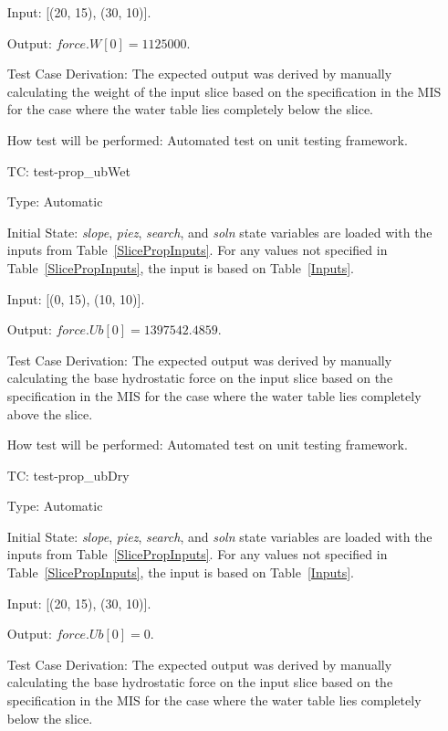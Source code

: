 \documentclass[12pt, titlepage]{article}
\newcounter{utestnum} %
\begin{document}
\begin{enumerate}[label=TC\arabic*:,ref={\arabic*}]
	Input: [(20, 15), (30, 10)].
	
	Output: $\textit{force.W}[0] = 1125000$.
	
	Test Case Derivation: The expected output was derived by manually 
	calculating the weight of the input slice based on the specification in the 
	MIS for the case where the water table lies completely below the slice.
	
	How test will be performed: Automated test on unit testing framework.
	
	\item [TC\refstepcounter{utestnum}\theutestnum: 
	\label{TC_PropertyUbWet}] 
	test-prop\_ubWet
	
	Type: Automatic
	
	Initial State: \textit{slope}, \textit{piez}, \textit{search}, and 
	\textit{soln} state variables are loaded with the inputs from 
	Table~\ref{SlicePropInputs}. For any values not specified in 
	Table~\ref{SlicePropInputs}, the input is based on Table~\ref{Inputs}.
	
	Input: [(0, 15), (10, 10)].
	
	Output: $\textit{force.Ub}[0] = 1397542.4859$.
	
	Test Case Derivation: The expected output was derived by manually 
	calculating the base hydrostatic force on the input slice based on the 
	specification in the MIS for the case where the water table lies completely 
	above the slice.
	
	How test will be performed: Automated test on unit testing framework.
	
	\item [TC\refstepcounter{utestnum}\theutestnum: 
	\label{TC_PropertyUbDry}] 
	test-prop\_ubDry
	
	Type: Automatic
	
	Initial State: \textit{slope}, \textit{piez}, \textit{search}, and 
	\textit{soln} state variables are loaded with the inputs from 
	Table~\ref{SlicePropInputs}. For any values not specified in 
	Table~\ref{SlicePropInputs}, the input is based on Table~\ref{Inputs}.
	
	Input: [(20, 15), (30, 10)].
	
	Output: $\textit{force.Ub}[0] = 0$.
	
	Test Case Derivation: The expected output was derived by manually 
	calculating the base hydrostatic force on the input slice based on the 
	specification in the MIS for the case where the water table lies completely 
	below the slice.
	

\end{enumerate}
\end{document}

